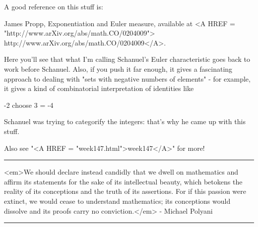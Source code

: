 A good reference on this stuff is:

James Propp, Exponentiation and Euler measure,
available at <A HREF = "http://www.arXiv.org/abs/math.CO/0204009">
http://www.arXiv.org/abs/math.CO/0204009</A>.

Here you'll see that what I'm calling Schanuel's Euler
characteristic goes back to work before Schanuel.  Also,
if you push it far enough, it gives a fascinating approach 
to dealing with "sets with negative numbers of elements" - 
for example, it gives a kind of combinatorial interpretation
of identities like

-2 choose 3 = -4

Schanuel was trying to categorify the integers: that's
why he came up with this stuff.

Also see "<A HREF = "week147.html">week147</A>" for more!
$$
    


\par\noindent\rule{\textwidth}{0.4pt}
<em>We should declare instead candidly that we dwell on mathematics and 
affirm its statements for the sake of its intellectual beauty, which 
betokens the reality of its conceptions and the truth of its assertions. 
For if this passion were extinct, we would cease to understand mathematics; 
its conceptions would dissolve and its proofs carry no conviction.</em> - 
Michael Polyani
\par\noindent\rule{\textwidth}{0.4pt}

